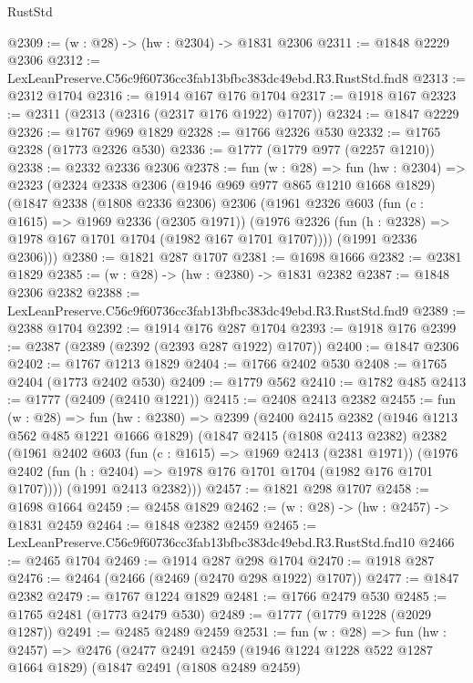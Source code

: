 \begin{lexlean}{RustStd}
\begin{coremodule}
@2309 := (w : @28) -> (hw : @2304) -> @1831 @2306
@2311 := @1848 @2229 @2306
@2312 := LexLeanPreserve.C56c9f60736cc3fab13bfbc383dc49ebd.R3.RustStd.fnd8
@2313 := @2312 @1704
@2316 := @1914 @167 @176 @1704
@2317 := @1918 @167
@2323 := @2311 (@2313 (@2316 (@2317 @176 @1922) @1707))
@2324 := @1847 @2229
@2326 := @1767 @969 @1829
@2328 := @1766 @2326 @530
@2332 := @1765 @2328 (@1773 @2326 @530)
@2336 := @1777 (@1779 @977 (@2257 @1210))
@2338 := @2332 @2336 @2306
@2378 := fun (w : @28) =>
  fun (hw : @2304) =>
  @2323
    (@2324
      @2338
      @2306
      (@1946 @969 @977 @865 @1210 @1668 @1829)
      (@1847
        @2338
        (@1808 @2336 @2306)
        @2306
        (@1961
          @2326
          @603
          (fun (c : @1615) => @1969 @2336 (@2305 @1971))
          (@1976 @2326 (fun (h : @2328) => @1978 @167 @1701 @1704 (@1982 @167 @1701 @1707))))
        (@1991 @2336 @2306)))
@2380 := @1821 @287 @1707
@2381 := @1698 @1666
@2382 := @2381 @1829
@2385 := (w : @28) -> (hw : @2380) -> @1831 @2382
@2387 := @1848 @2306 @2382
@2388 := LexLeanPreserve.C56c9f60736cc3fab13bfbc383dc49ebd.R3.RustStd.fnd9
@2389 := @2388 @1704
@2392 := @1914 @176 @287 @1704
@2393 := @1918 @176
@2399 := @2387 (@2389 (@2392 (@2393 @287 @1922) @1707))
@2400 := @1847 @2306
@2402 := @1767 @1213 @1829
@2404 := @1766 @2402 @530
@2408 := @1765 @2404 (@1773 @2402 @530)
@2409 := @1779 @562
@2410 := @1782 @485
@2413 := @1777 (@2409 (@2410 @1221))
@2415 := @2408 @2413 @2382
@2455 := fun (w : @28) =>
  fun (hw : @2380) =>
  @2399
    (@2400
      @2415
      @2382
      (@1946 @1213 @562 @485 @1221 @1666 @1829)
      (@1847
        @2415
        (@1808 @2413 @2382)
        @2382
        (@1961
          @2402
          @603
          (fun (c : @1615) => @1969 @2413 (@2381 @1971))
          (@1976 @2402 (fun (h : @2404) => @1978 @176 @1701 @1704 (@1982 @176 @1701 @1707))))
        (@1991 @2413 @2382)))
@2457 := @1821 @298 @1707
@2458 := @1698 @1664
@2459 := @2458 @1829
@2462 := (w : @28) -> (hw : @2457) -> @1831 @2459
@2464 := @1848 @2382 @2459
@2465 := LexLeanPreserve.C56c9f60736cc3fab13bfbc383dc49ebd.R3.RustStd.fnd10
@2466 := @2465 @1704
@2469 := @1914 @287 @298 @1704
@2470 := @1918 @287
@2476 := @2464 (@2466 (@2469 (@2470 @298 @1922) @1707))
@2477 := @1847 @2382
@2479 := @1767 @1224 @1829
@2481 := @1766 @2479 @530
@2485 := @1765 @2481 (@1773 @2479 @530)
@2489 := @1777 (@1779 @1228 (@2029 @1287))
@2491 := @2485 @2489 @2459
@2531 := fun (w : @28) =>
  fun (hw : @2457) =>
  @2476
    (@2477
      @2491
      @2459
      (@1946 @1224 @1228 @522 @1287 @1664 @1829)
      (@1847
        @2491
        (@1808 @2489 @2459)

\end{coremodule}
\end{lexlean}
